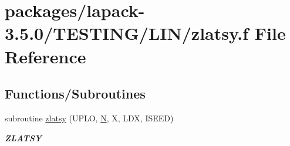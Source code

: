 \hypertarget{zlatsy_8f}{}\section{packages/lapack-\/3.5.0/\+T\+E\+S\+T\+I\+N\+G/\+L\+I\+N/zlatsy.f File Reference}
\label{zlatsy_8f}
\subsection*{Functions/\+Subroutines}
\begin{DoxyCompactItemize}
\item 
subroutine \hyperlink{group__complex16__lin_ga2494e654692b79e367a4c5cfcdb83ec7}{zlatsy} (U\+P\+L\+O, \hyperlink{polmisc_8c_a0240ac851181b84ac374872dc5434ee4}{N}, X, L\+D\+X, I\+S\+E\+E\+D)
\begin{DoxyCompactList}\small\item\em {\bfseries Z\+L\+A\+T\+S\+Y} \end{DoxyCompactList}\end{DoxyCompactItemize}
